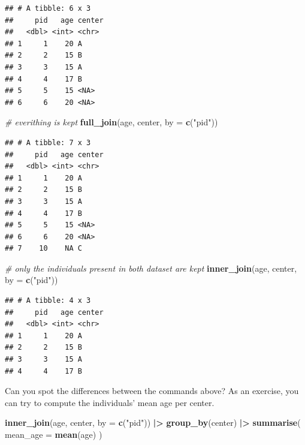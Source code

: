 \documentclass[
]{book}
\newenvironment{Shaded}{\begin{snugshade}}{\end{snugshade}}
\newcommand{\AttributeTok}[1]{\textcolor[rgb]{0.13,0.29,0.53}{#1}}
\newcommand{\CommentTok}[1]{\textcolor[rgb]{0.56,0.35,0.01}{\textit{#1}}}
\newcommand{\FunctionTok}[1]{\textcolor[rgb]{0.13,0.29,0.53}{\textbf{#1}}}
\newcommand{\NormalTok}[1]{#1}
\newcommand{\SpecialCharTok}[1]{\textcolor[rgb]{0.81,0.36,0.00}{\textbf{#1}}}
\newcommand{\StringTok}[1]{\textcolor[rgb]{0.31,0.60,0.02}{#1}}
\begin{document}
\begin{verbatim}
## # A tibble: 6 x 3
##     pid   age center
##   <dbl> <int> <chr> 
## 1     1    20 A     
## 2     2    15 B     
## 3     3    15 A     
## 4     4    17 B     
## 5     5    15 <NA>  
## 6     6    20 <NA>
\end{verbatim}

\begin{Shaded}
\begin{Highlighting}[]
\CommentTok{\# everithing is kept}
\FunctionTok{full\_join}\NormalTok{(age, center, }\AttributeTok{by =} \FunctionTok{c}\NormalTok{(}\StringTok{"pid"}\NormalTok{))}
\end{Highlighting}
\end{Shaded}

\begin{verbatim}
## # A tibble: 7 x 3
##     pid   age center
##   <dbl> <int> <chr> 
## 1     1    20 A     
## 2     2    15 B     
## 3     3    15 A     
## 4     4    17 B     
## 5     5    15 <NA>  
## 6     6    20 <NA>  
## 7    10    NA C
\end{verbatim}

\begin{Shaded}
\begin{Highlighting}[]
\CommentTok{\# only the individuals present in both dataset are kept}
\FunctionTok{inner\_join}\NormalTok{(age, center, }\AttributeTok{by =} \FunctionTok{c}\NormalTok{(}\StringTok{"pid"}\NormalTok{))}
\end{Highlighting}
\end{Shaded}

\begin{verbatim}
## # A tibble: 4 x 3
##     pid   age center
##   <dbl> <int> <chr> 
## 1     1    20 A     
## 2     2    15 B     
## 3     3    15 A     
## 4     4    17 B
\end{verbatim}

Can you spot the differences between the commands above?
As an exercise, you can try to compute the individuals' mean age per center.

\begin{Shaded}
\begin{Highlighting}[]
\FunctionTok{inner\_join}\NormalTok{(age, center, }\AttributeTok{by =} \FunctionTok{c}\NormalTok{(}\StringTok{"pid"}\NormalTok{)) }\SpecialCharTok{|\textgreater{}}
  \FunctionTok{group\_by}\NormalTok{(center) }\SpecialCharTok{|\textgreater{}}
  \FunctionTok{summarise}\NormalTok{(}
    \AttributeTok{mean\_age =} \FunctionTok{mean}\NormalTok{(age)}
\NormalTok{  )}
\end{Highlighting}
\end{Shaded}
\end{document}
